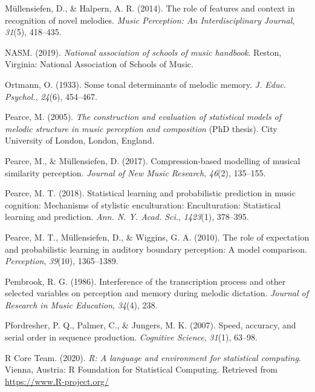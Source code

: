 \documentclass[english,man,floatsintext]{apa6}
\begin{document}
\leavevmode\hypertarget{ref-Mullensiefen2014-ta}{}%
Müllensiefen, D., \& Halpern, A. R. (2014). The role of features and context in recognition of novel melodies. \emph{Music Perception: An Interdisciplinary Journal}, \emph{31}(5), 418--435.

\leavevmode\hypertarget{ref-Nasm2019-fs}{}%
NASM. (2019). \emph{National association of schools of music handbook}. Reston, Virginia: National Association of Schools of Music.

\leavevmode\hypertarget{ref-Ortmann1933-ty}{}%
Ortmann, O. (1933). Some tonal determinants of melodic memory. \emph{J. Educ. Psychol.}, \emph{24}(6), 454--467.

\leavevmode\hypertarget{ref-Pearce2005-hb}{}%
Pearce, M. (2005). \emph{The construction and evaluation of statistical models of melodic structure in music perception and composition} (PhD thesis). City University of London, London, England.

\leavevmode\hypertarget{ref-Pearce2017-rr}{}%
Pearce, M., \& Müllensiefen, D. (2017). Compression-based modelling of musical similarity perception. \emph{Journal of New Music Research}, \emph{46}(2), 135--155.

\leavevmode\hypertarget{ref-Pearce2018-lb}{}%
Pearce, M. T. (2018). Statistical learning and probabilistic prediction in music cognition: Mechanisms of stylistic enculturation: Enculturation: Statistical learning and prediction. \emph{Ann. N. Y. Acad. Sci.}, \emph{1423}(1), 378--395.

\leavevmode\hypertarget{ref-Pearce2010-mw}{}%
Pearce, M. T., Müllensiefen, D., \& Wiggins, G. A. (2010). The role of expectation and probabilistic learning in auditory boundary perception: A model comparison. \emph{Perception}, \emph{39}(10), 1365--1389.

\leavevmode\hypertarget{ref-Pembrook1986-cg}{}%
Pembrook, R. G. (1986). Interference of the transcription process and other selected variables on perception and memory during melodic dictation. \emph{Journal of Research in Music Education}, \emph{34}(4), 238.

\leavevmode\hypertarget{ref-pfordresher2007speed}{}%
Pfordresher, P. Q., Palmer, C., \& Jungers, M. K. (2007). Speed, accuracy, and serial order in sequence production. \emph{Cognitive Science}, \emph{31}(1), 63--98.

\leavevmode\hypertarget{ref-R-base}{}%
R Core Team. (2020). \emph{R: A language and environment for statistical computing}. Vienna, Austria: R Foundation for Statistical Computing. Retrieved from \url{https://www.R-project.org/}
\end{document}
